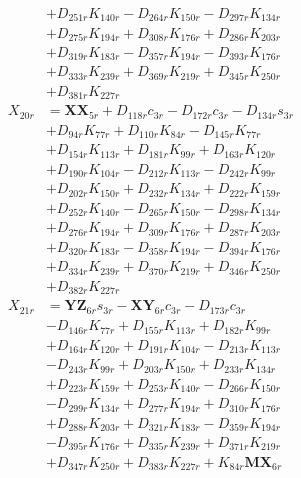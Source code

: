 \begin{multicols}{2}
\begin{align}
&+ D_{251r}K_{140r} - D_{264r}K_{150r} - D_{297r}K_{134r}  \nonumber \\
&+ D_{275r}K_{194r} + D_{308r}K_{176r} + D_{286r}K_{203r}  \nonumber \\
&+ D_{319r}K_{183r} - D_{357r}K_{194r} - D_{393r}K_{176r}  \nonumber \\
&+ D_{333r}K_{239r} + D_{369r}K_{219r} + D_{345r}K_{250r}  \nonumber \\
&+ D_{381r}K_{227r} \nonumber \\
X_{20r} &= \mathbf{XX}_{5r} + D_{118r}c_{3r} - D_{172r}c_{3r} - D_{134r}s_{3r}  \nonumber \\
&+ D_{94r}K_{77r} + D_{110r}K_{84r} - D_{145r}K_{77r}  \nonumber \\
&+ D_{154r}K_{113r} + D_{181r}K_{99r} + D_{163r}K_{120r}  \nonumber \\
&+ D_{190r}K_{104r} - D_{212r}K_{113r} - D_{242r}K_{99r}  \nonumber \\
&+ D_{202r}K_{150r} + D_{232r}K_{134r} + D_{222r}K_{159r}  \nonumber \\
&+ D_{252r}K_{140r} - D_{265r}K_{150r} - D_{298r}K_{134r}  \nonumber \\
&+ D_{276r}K_{194r} + D_{309r}K_{176r} + D_{287r}K_{203r}  \nonumber \\
&+ D_{320r}K_{183r} - D_{358r}K_{194r} - D_{394r}K_{176r}  \nonumber \\
&+ D_{334r}K_{239r} + D_{370r}K_{219r} + D_{346r}K_{250r}  \nonumber \\
&+ D_{382r}K_{227r} \nonumber \\
X_{21r} &= \mathbf{YZ}_{6r}s_{3r} - \mathbf{XY}_{6r}c_{3r} - D_{173r}c_{3r}  \nonumber \\
&- D_{146r}K_{77r} + D_{155r}K_{113r} + D_{182r}K_{99r}  \nonumber \\
&+ D_{164r}K_{120r} + D_{191r}K_{104r} - D_{213r}K_{113r}  \nonumber \\
&- D_{243r}K_{99r} + D_{203r}K_{150r} + D_{233r}K_{134r}  \nonumber \\
&+ D_{223r}K_{159r} + D_{253r}K_{140r} - D_{266r}K_{150r}  \nonumber \\
&- D_{299r}K_{134r} + D_{277r}K_{194r} + D_{310r}K_{176r}  \nonumber \\
&+ D_{288r}K_{203r} + D_{321r}K_{183r} - D_{359r}K_{194r}  \nonumber \\
&- D_{395r}K_{176r} + D_{335r}K_{239r} + D_{371r}K_{219r}  \nonumber \\
&+ D_{347r}K_{250r} + D_{383r}K_{227r} + K_{84r}\mathbf{MX}_{6r}  \nonumber \\

\end{align}
\end{multicols}
